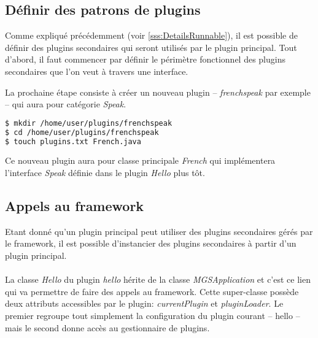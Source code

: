 \documentclass[12pt,a4paper]{article}
\begin{document}
\subsection{Définir des patrons de plugins}
Comme expliqué précédemment (voir \ref{sss:DetailsRunnable}), il est possible de 
définir des plugins secondaires qui seront utilisés par le plugin principal. 
Tout d'abord, il faut commencer par définir le périmètre fonctionnel des 
plugins secondaires que l'on veut à travers une interface.

\lstset{language=java,caption=Speak interface for Hello plugin}


La prochaine étape consiste à créer un nouveau plugin -- \emph{frenchspeak} par 
exemple -- qui aura pour catégorie \emph{Speak}.

\begin{lstlisting}[language=bash,caption=Création du plugin secondaire frenchspeak]
$ mkdir /home/user/plugins/frenchspeak
$ cd /home/user/plugins/frenchspeak
$ touch plugins.txt French.java
\end{lstlisting}

Ce nouveau plugin aura pour classe principale \emph{French} qui implémentera 
l'interface \emph{Speak} définie dans le plugin \emph{Hello} plus tôt.
\lstset{language=bash,caption=FrenchSpeak plugin configuration}



\lstset{language=java,caption=FrenchSpeak plugin main class}


\subsection{Appels au framework}
Etant donné qu'un plugin principal peut utiliser des plugins secondaires gérés 
par le framework, il est possible d'instancier des plugins secondaires à 
partir d'un plugin principal.
\\\\
La classe \emph{Hello} du plugin \emph{hello} hérite de la classe 
\emph{MGSApplication} et c'est ce lien qui va permettre de faire des appels 
au framework. Cette super-classe possède deux attributs accessibles par le plugin:
\emph{currentPlugin} et \emph{pluginLoader}. Le premier regroupe tout simplement 
la configuration du plugin courant -- hello -- mais le second donne accès au 
gestionnaire de plugins.
\end{document}
